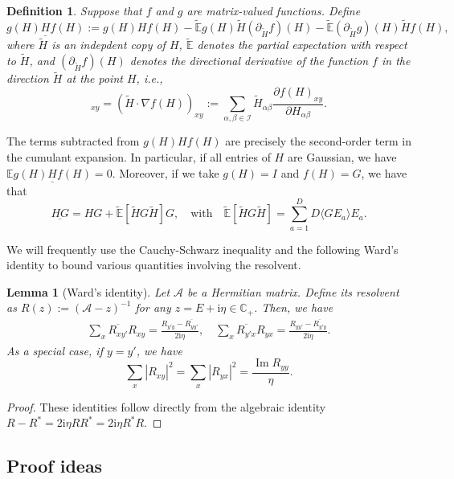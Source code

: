 \documentclass[10pt,reqno]{amsart}
\numberwithin{equation}{section}
\numberwithin{figure}{section}
\theoremstyle{plain} %
\newtheorem{lemma}[theorem]{Lemma}
\newtheorem{definition}[theorem]{Definition}
\theoremstyle{definition} %
\newcommand{\cal}{\mathcal}
\newcommand{\wt}{\widetilde}
\newcommand{\E}{\mathbb{E}}
\newcommand{\C}{\mathbb{C}}
\newcommand{\cI}{\mathcal{I}}
\newcommand{\ii}{\mathrm{i}}
\DeclareMathOperator{\im}{\mathrm{Im}}
\newcommand{\be}{\begin{equation}}
\newcommand{\ee}{\end{equation}}
\numberwithin{equation}{section}
\begin{document}
\begin{definition}\label{def:underline}
Suppose that $f$ and $g$ are matrix-valued functions. Define
\be
\underline{g(H)Hf(H)} := g(H)Hf(H)-\widetilde{\E}g(H)\widetilde{H}(\partial_{\widetilde{H}}f)(H) - \widetilde{\E}(\partial_{\widetilde{H}}g)(H)\widetilde{H}f(H),
\ee
where $\widetilde{H}$ is an indepdent copy of $H$, $\widetilde{\E}$ denotes the partial expectation with respect to $\wt H$, and $(\partial_{\widetilde{H}}f)(H)$ denotes the directional derivative of the function $f$ in the direction $\wt H$ at the point $H$, i.e.,
\be
[(\partial_{\widetilde{H}}f)(H)]_{xy} = (\widetilde{H}\cdot \nabla f(H))_{xy} := \sum_{\alpha,\beta\in \cI}\widetilde{H}_{\alpha\beta}\frac{\partial f(H)_{xy}}{\partial H_{\alpha\beta}}.
\ee
\end{definition}

The terms subtracted from $g(H)Hf(H)$ are precisely the second-order term in the cumulant expansion. In particular, if all entries of $H$ are Gaussian, we have $\E\underline{g(H)Hf(H)} = 0$. Moreover, if we take $g(H) = I$ and $f(H) = G$, we have that
\be\label{eq:HGline}
\underline{HG} = HG + \widetilde{\E}[\widetilde{H}G\widetilde{H}]G,\quad \text{with}\quad \widetilde{\E}[\widetilde{H}G\widetilde{H}] = \sum_{a=1}^D D\langle GE_a\rangle E_a.
\ee

We will frequently use the Cauchy-Schwarz inequality and the following Ward's identity to bound various quantities involving the resolvent.

\begin{lemma}[Ward's identity]\label{lem-Ward}
Let $\cal A$ be a Hermitian matrix. Define its resolvent as $R(z):=(\cal A-z)^{-1}$ for any $z= E+ \ii \eta\in \C_+$. Then, we have 
    \be\label{eq_Ward0}
    \begin{split}
\sum_x \overline {R_{xy'}}  R_{xy} = \frac{R_{y'y}-\overline{R_{yy'}}}{2\ii \eta},\quad
\sum_x \overline {R_{y'x}}  R_{yx} = \frac{R_{yy'}-\overline{R_{y'y}}}{2\ii \eta}.
\end{split}
\ee
As a special case, if $y=y'$, we have
\be\label{eq_Ward}
\sum_x |R_{xy}|^2 =\sum_x |R_{yx}|^2 = \frac{\im R_{yy}}{ \eta}.
\ee
\end{lemma}
\begin{proof}
These identities follow directly from the algebraic identity $R-R^*=2\ii \eta RR^*=2\ii \eta R^*R$.
\end{proof} 

\subsection{Proof ideas}\label{sec_idea}
\end{document}
